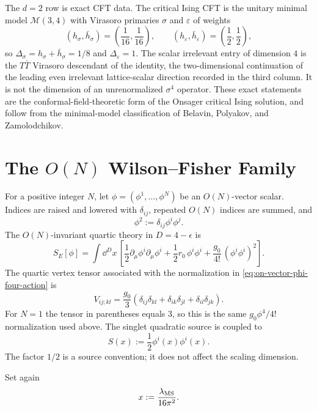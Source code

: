 The \(d=2\) row is exact CFT data.  The critical Ising CFT is the unitary
minimal model \(\mathcal M(3,4)\) with Virasoro primaries
\(\sigma\) and \(\varepsilon\) of weights
\[
  (h_\sigma,\bar h_\sigma)=\left(\frac1{16},\frac1{16}\right),
  \qquad
  (h_\varepsilon,\bar h_\varepsilon)=\left(\frac12,\frac12\right),
\]
so \(\Delta_\sigma=h_\sigma+\bar h_\sigma=1/8\) and
\(\Delta_\varepsilon=1\).  The scalar irrelevant entry of dimension \(4\) is
the \(T\bar T\) Virasoro descendant of the identity, the two-dimensional
continuation of the leading even irrelevant lattice-scalar direction recorded in
the third column.  It is not the dimension of an unrenormalized \(\sigma^4\)
operator.  These exact statements are the conformal-field-theoretic form of the
Onsager critical Ising solution, and follow from the minimal-model
classification of Belavin, Polyakov, and Zamolodchikov.

\section{\texorpdfstring{The \(O(N)\) Wilson--Fisher Family}{The O(N) Wilson-Fisher Family}}
\label{sec:on-wilson-fisher-family}

\begin{definition}
\label{def:on-quartic-scalar-chart}
For a positive integer \(N\), let
\(\phi=(\phi^1,\ldots,\phi^N)\) be an \(O(N)\)-vector scalar.  Indices are
raised and lowered with \(\delta_{ij}\), repeated \(O(N)\) indices are
summed, and
\[
  \phi^2:=\delta_{ij}\phi^i\phi^j .
\]
The \(O(N)\)-invariant quartic theory in \(D=4-\epsilon\) is
\begin{equation}
  S_E[\phi]
  =
  \int \dd^D x\,
  \left[
    \frac12\partial_\mu\phi^i\partial_\mu\phi^i
    +\frac12 r_0\,\phi^i\phi^i
    +\frac{g_0}{4!}\,(\phi^i\phi^i)^2
  \right].
  \label{eq:on-vector-phi-four-action}
\end{equation}
The quartic vertex tensor associated with the normalization in
\eqref{eq:on-vector-phi-four-action} is
\begin{equation}
  V_{ij;kl}
  =
  \frac{g_0}{3}
  \left(
    \delta_{ij}\delta_{kl}
    +\delta_{ik}\delta_{jl}
    +\delta_{il}\delta_{jk}
  \right).
  \label{eq:on-quartic-vertex-tensor}
\end{equation}
For \(N=1\) the tensor in parentheses equals \(3\), so this is the same
\(g_0\phi^4/4!\) normalization used above.  The singlet quadratic source is
coupled to
\[
  S(x):=\frac12\phi^i(x)\phi^i(x).
\]
The factor \(1/2\) is a source convention; it does not affect the scaling
dimension.

Set again
\[
  x:=\frac{\lambda_{\rm MS}}{16\pi^2}.
\]
\end{definition}

